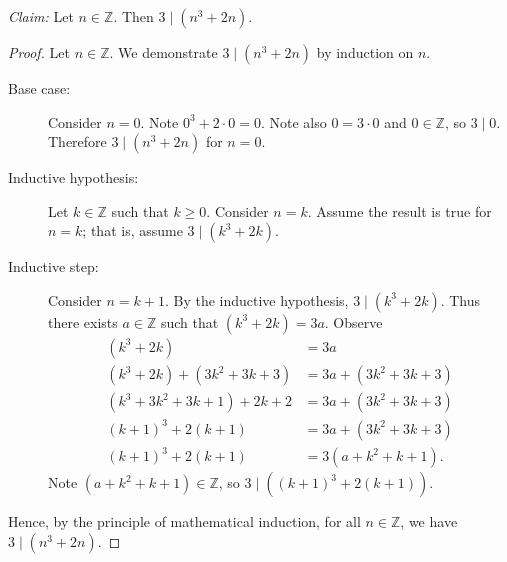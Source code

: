\documentclass{article}
\newcommand{\Z}{\mathbb{Z}}
\theoremstyle{definition}
\begin{document}
\begin{solution}
\newline

\noindent\textit{Claim: }Let $n\in\Z$. Then $3\mid\left(n^3+2n\right)$.
\begin{proof}
Let $n\in\Z$. We demonstrate $3\mid\left(n^3+2n\right)$ by induction on $n$.
\begin{description}
    \item[Base case: ] Consider $n=0$. Note $0^3+2\cdot 0=0$. Note also $0=3\cdot 0$ and $0\in\Z$, so $3\mid 0$. Therefore $3\mid\left(n^3+2n\right)$ for $n=0$.
    \item[Inductive hypothesis: ] Let $k\in\Z$ such that $k\geq 0$. Consider $n=k$. Assume the result is true for $n=k$; that is, assume $3\mid\left(k^3+2k\right)$.
    \item[Inductive step: ] Consider $n=k+1$. By the inductive hypothesis, $3\mid\left(k^3+2k\right)$. Thus there exists $a\in\Z$ such that $\left(k^3+2k\right)=3a$. Observe
    \begin{align*}
    \left(k^3+2k\right)&=3a\\
    \left(k^3+2k\right)+\left(3k^2+3k+3\right)&=3a+\left(3k^2+3k+3\right)\\
    \left(k^3+3k^2+3k+1\right)+2k+2&=3a+\left(3k^2+3k+3\right)\\
    \left(k+1\right)^3+2(k+1)&=3a+\left(3k^2+3k+3\right)\\
    \left(k+1\right)^3+2(k+1)&=3\left(a+k^2+k+1\right).
    \end{align*}
    Note $\left(a+k^2+k+1\right)\in\Z$, so $3\mid\left((k+1)^3+2(k+1)\right)$.
\end{description}
Hence, by the principle of mathematical induction, for all $n\in\Z$, we have $3\mid\left(n^3+2n\right)$.
\end{proof}
\end{solution}
\end{document}
